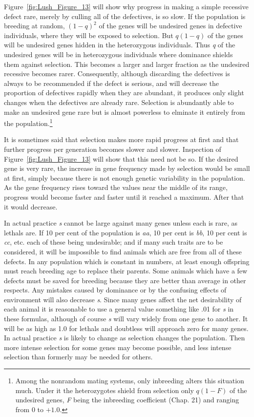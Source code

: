 Figure~\ref{fig:Lush_Figure_13} will show why progress in making a simple
recessive defect rare, merely by culling all of the defectives, is so slow.
If the population is breeding at random, $(1 - q)^2$ of the genes will be
undesired genes in defective individuals, where they will be exposed to
selection. But $q(1 - q)$ of the genes will be undesired genes hidden in the
heterozygous individuals. Thus \textit{q} of the undesired genes will be in
heterozygous individuals where dominance shields them against selection. This
becomes a larger and larger fraction as the undesired recessive becomes rarer.
Consequently, although discarding the defectives is always to be recommended
if the defect is serious, and will decrease the proportion of defectives
rapidly when they are abundant, it produces only slight changes when the
defectives are already rare. Selection is abundantly able to make an undesired
gene rare but is almost powerless to elminate it entirely from the
population.\footnote{Among the nonrandom mating systems, only inbreeding alters
this situation much. Under it the heterozygotes shield from selection only
$q(1 - F)$ of the undesired genes, \textit{F} being the inbreeding coefficient
(Chap. 21) and ranging from $0$ to $+1.0$.}

It is sometimes said that selection makes more rapid progress at first
and that further progress per generation becomes slower and slower.
Inspection of Figure~\ref{fig:Lush_Figure_13} will show that this need not be so. If the desired
gene is very rare, the increase in gene frequency made by selection
would be small at first, simply because there is not enough genetic variability
in the population. As the gene frequency rises toward the values
near the middle of its range, progress would become faster and faster
until it reached a maximum. After that it would decrease.

In actual practice \textit{s} cannot be large against many genes unless each
is rare, as lethals are. If 10 per cent of the population is \textit{aa},
10 per cent is \textit{bb}, 10 per cent is \textit{cc}, etc. each of these
being undesirable; and if many
such traits are to be considered, it will be impossible to find animals
which are free from all of these defects. In any population which is
constant in numbers, at least enough offspring must reach breeding age
to replace their parents. Some animals which have a few defects must
be saved for breeding because they are better than average in other
respects. Any mistakes caused by dominance or by the confusing effects
of environment will also decrease \textit{s}. Since many genes affect the net
desirability of each animal it is reasonable to use a general value something
like .01 for \textit{s} in these formulas, although of course \textit{s} will vary
widely from one gene to another. It will be as high as 1.0 for lethals and
doubtless will approach zero for many genes. In actual practice \textit{s} is likely
to change as selection changes the population. Then more intense
selection for some genes may become possible, and less intense selection
than formerly may be needed for others.

